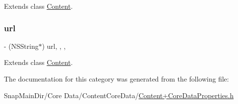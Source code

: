 Extends class \hyperlink{interface_content_a548aaf829a86fcdfdbe44b8c1964340e}{Content}.

\hypertarget{category_content_07_core_data_properties_08_a69ab79cf4ff1fc815c93956fc9108dfd}{}\label{category_content_07_core_data_properties_08_a69ab79cf4ff1fc815c93956fc9108dfd} 
\subsubsection{\texorpdfstring{url}{url}}
{\footnotesize\ttfamily -\/ (N\+S\+String$\ast$) url\hspace{0.3cm}{\ttfamily [read]}, {\ttfamily [write]}, {\ttfamily [nonatomic]}, {\ttfamily [retain]}}



Extends class \hyperlink{interface_content_a69ab79cf4ff1fc815c93956fc9108dfd}{Content}.



The documentation for this category was generated from the following file\+:\begin{DoxyCompactItemize}
\item 
Snap\+Main\+Dir/\+Core Data/\+Content\+Core\+Data/\hyperlink{_content_09_core_data_properties_8h}{Content+\+Core\+Data\+Properties.\+h}\end{DoxyCompactItemize}
